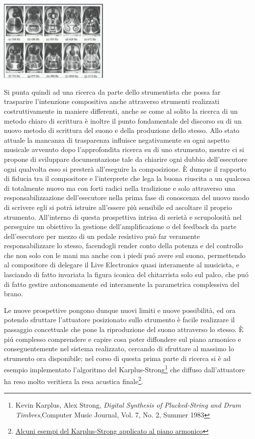 \documentclass[oneside]{article}
\begin{document}
\begin{multicols*}{2}
\includegraphics[width=0.4\textwidth]{img/chladni1.png}

Si punta quindi ad una ricerca da parte dello strumentista che possa far trasparire l'intenzione compositiva anche attraverso strumenti realizzati costruttivamente in maniere differenti, anche se come al solito la ricerca di un metodo chiaro di scrittura è inoltre il punto fondamentale del discorso su di un nuovo metodo di scrittura del suono e della produzione dello stesso. Allo stato attuale la mancanza di trasparenza influisce negativamente su ogni aspetto musicale avvenuto dopo l'approfondita ricerca su di uno strumento, mentre ci si propone di sviluppare documentazione tale da chiarire ogni dubbio dell'esecutore ogni qualvolta esso si presterà all'eseguire la composizione. È dunque il rapporto di fiducia tra il compositore e l'interprete che lega la buona riuscita a un qualcosa di totalmente nuovo ma con forti radici nella tradizione e solo attraverso una responsabilizzazione dell'esecutore nella prima fase di conoscenza del nuovo modo di scrivere egli si potrà istruire all'essere più sensibile ed ascoltare il proprio strumento. All'interno di questa prospettiva intrisa di serietà e scrupolosità nel perseguire un obiettivo la gestione dell'amplificazione o del feedback da parte dell'esecutore per mezzo di un pedale resistivo può far veramente responsabilizzare lo stesso, facendogli render conto della potenza e del controllo che non solo con le mani ma anche con i piedi puó avere sul suono, permettendo al compositore di delegare il Live Electronics quasi interamente al musicista, e lasciando di fatto invariata la figura iconica del chitarrista solo sul palco, che puó di fatto gestire autonomamente ed interamente la parametrica complessiva del brano.

Le nuove prospettive pongono dunque nuovi limiti e nuove possibilità, ed ora potendo sfruttare l'attuatore posizionato sullo strumento è facile realizzare il passaggio concettuale che pone la riproduzione del suono attraverso lo stesso. È piú complesso comprendere e capire cosa poter diffondere sul piano armonico e conseguentemente nel sistema realizzato, cercando di sfruttare al massimo lo strumento ora disponibile; nel corso di questa prima parte di ricerca si è ad esempio implementato l'algoritmo del Karplus-Strong\footnote{Kevin Karplus, Alex Strong, \emph{Digital Synthesis of Plucked-String and Drum Timbres},Computer Music Journal, Vol. 7, No. 2, Summer 1983} che diffuso dall'attuatore ha reso molto veritiera la resa acustica finale\footnote{\href{https://github.com/SMERM/BN-Tedesco/tree/master/COME-02/Lezioni_in_Compresenza/20200331/Esempi_Karplus-Strong_Attuatore_su_chitarra}{Alcuni esempi del Karplus-Strong applicato al piano armonico}}. 



\end{multicols*}
\end{document}
